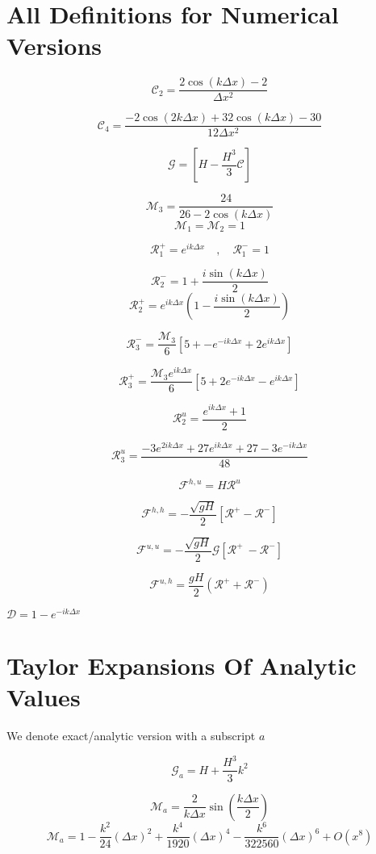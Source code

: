 \documentclass[12pt]{article}
\begin{document}
\section{All Definitions for Numerical Versions}
\[\mathcal{C}_2 = \frac{ 2\cos\left(k\Delta x\right) - 2 }{\Delta x^2}\]

\[\mathcal{C}_4 = \frac{-2\cos\left(2k\Delta x\right) + 32\cos\left(k\Delta x\right)  - 30 }{12\Delta x^2}\]

\[\mathcal{G} = \left[H -\frac{H^3}{3} \mathcal{C}\right]\]

\[\mathcal{M}_3= \frac{24}{26  -2\cos\left(k\Delta x\right)}\]
\[\mathcal{M}_1 = \mathcal{M}_2 = 1\]

\[\mathcal{R}^+_1 =  e^{ik\Delta x} \quad , \quad\mathcal{R}^-_1 =  1\]

\[\mathcal{R}_2^- = 1  + \frac{i\sin\left(k\Delta x\right)}{2}\]
\[\mathcal{R}_2^+ = e^{ik\Delta x}\left(1  - \frac{i\sin\left(k\Delta x\right)}{2} \right)\]

\[\mathcal{R}_3^-= \frac{\mathcal{M}_3}{6}\left[5 +  - e^{-ik\Delta x} + 2e^{ik\Delta x} \right]\]

\[\mathcal{R}_3^+= \frac{\mathcal{M}_3 e^{ik\Delta x }}{6}\left[5 + 2e^{-ik\Delta x} - e^{ik\Delta x} \right]\] 

\[\mathcal{R}^u_2 = \frac{e^{ik\Delta x } + 1}{2} \]

\[\mathcal{R}^u_3 = \frac{-3e^{2ik\Delta x } + 27e^{ik\Delta x } + 27 - 3e^{-ik\Delta x }}{48}\]


\[\mathcal{F}^{h,u} = H\mathcal{R}^u\]

\[\mathcal{F}^{h,h} = -\dfrac{ \sqrt{gH}}{ 2} \left [ \mathcal{R}^+- \mathcal{R}^- \right ]\]

\[\mathcal{F}^{u,u} = - \dfrac{ \sqrt{gH}}{ 2} \mathcal{G} \left [ \mathcal{R}^+ \ -  \mathcal{R}^-  \right ]\]

\[\mathcal{F}^{u,h} = \dfrac{ gH}{ 2} \left(\mathcal{R}^+ + \mathcal{R}^-\right)\]


$\mathcal{D} = 1 -e^{-ik\Delta x}$

\section{Taylor Expansions Of Analytic Values }
We denote exact/analytic version with a subscript $a$

\[\mathcal{G}_a = H + \frac{H^3}{3}k^2\]

\[\mathcal{M}_a = \frac{2}{k\Delta x} \sin\left(\frac{k \Delta x}{2}\right) \]
\[\mathcal{M}_a = 1 - \frac{k^2}{24} (\Delta x)^2 + \frac{k^4}{1920} (\Delta x)^4 - \frac{k^6}{322560} (\Delta x)^6 + O(x^{8}) \]
\end{document}
